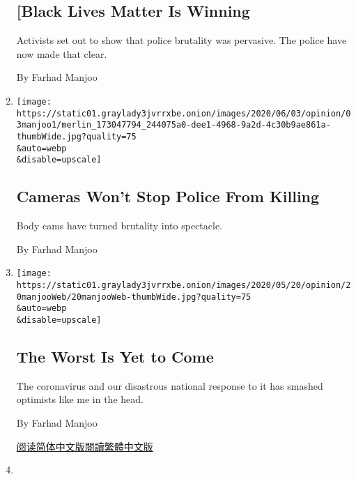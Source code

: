 \begin{enumerate}
  \hypertarget{black-lives-matter-is-winning}{%
  \subsection{{[}Black Lives Matter Is
  Winning}\label{black-lives-matter-is-winning}}

  Activists set out to show that police brutality was pervasive. The
  police have now made that clear.

  By Farhad Manjoo
\item
  \href{/2020/06/03/opinion/george-floyd-video-police.html}{}

  \texttt{[image: https://static01.graylady3jvrrxbe.onion/images/2020/06/03/opinion/03manjoo1/merlin\_173047794\_244075a0-dee1-4968-9a2d-4c30b9ae861a-thumbWide.jpg?quality=75\\\&auto=webp\\\&disable=upscale]}

  \hypertarget{cameras-wont-stop-police-from-killing}{%
  \subsection{Cameras Won't Stop Police From
  Killing}\label{cameras-wont-stop-police-from-killing}}

  Body cams have turned brutality into spectacle.

  By Farhad Manjoo
\item
  \href{/2020/05/20/opinion/coronavirus-worst-case.html}{}

  \texttt{[image: https://static01.graylady3jvrrxbe.onion/images/2020/05/20/opinion/20manjooWeb/20manjooWeb-thumbWide.jpg?quality=75\\\&auto=webp\\\&disable=upscale]}

  \hypertarget{the-worst-is-yet-to-come}{%
  \subsection{The Worst Is Yet to Come}\label{the-worst-is-yet-to-come}}

  The coronavirus and our disastrous national response to it has smashed
  optimists like me in the head.

  By Farhad Manjoo

  \href{https://cn.nytimes3xbfgragh.onion/opinion/20200521/coronavirus-worst-case/}{阅读简体中文版}\href{https://cn.nytimes3xbfgragh.onion/opinion/20200521/coronavirus-worst-case/zh-hant/}{閱讀繁體中文版}
\item
  \href{/2020/05/13/opinion/inequality-san-francisco-coronavirus.html}{}


\end{enumerate}
